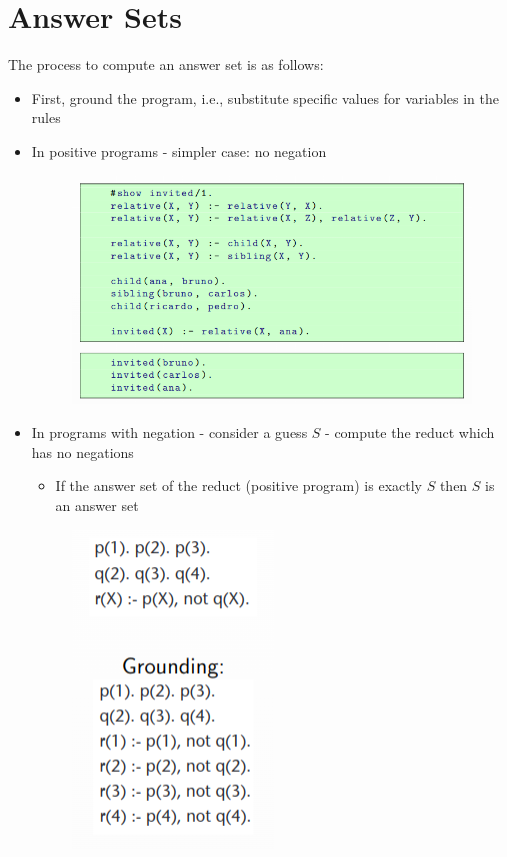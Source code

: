 \documentclass[10pt,a4paper]{report}
\begin{document}
\section{Answer Sets}
The process to compute an answer set is as follows:
\begin{itemize}
    \item First, ground the program, i.e., substitute specific values for variables in the rules
    \item In positive programs - simpler case: no negation
    \begin{figure}[H]
        \centering
        \includegraphics[scale=0.5]{43.png}
    \end{figure}
    \item In programs with negation - consider a guess $S$ - compute the reduct which has no negations
    \begin{itemize}
        \item If the answer set of the reduct (positive program) is exactly $S$ then $S$ is an answer set
    \end{itemize}
    \begin{figure}[H]
        \centering
        \includegraphics[scale=0.5]{44.png}

\end{figure}
\end{itemize}
\end{document}

